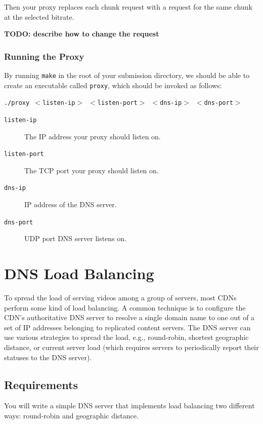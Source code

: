 \documentclass{article}
\begin{document}
Then your proxy replaces each chunk request with a request for the same chunk
at the selected bitrate.


\textbf{TODO: describe how to change the request}


\subsubsection{Running the Proxy}

By running \texttt{make} in the root of your
submission directory, we should be able to create an executable called
\texttt{proxy}, which should be invoked as follows:
\begin{center}
	\texttt{./proxy $<$listen-ip$>$ $<$listen-port$>$ $<$dns-ip$>$ $<$dns-port$>$}
\end{center}

\begin{description}
	\item[\texttt{listen-ip}] The IP address your proxy should listen on.
	\item[\texttt{listen-port}] The TCP port your proxy should listen on.
	\item[\texttt{dns-ip}] IP address of the DNS server.
	\item[\texttt{dns-port}] UDP port DNS server listens on.
\end{description}





\section{DNS Load Balancing}
\label{sec:dns}

To spread the load of serving videos among a group of servers, most CDNs
perform some kind of load balancing. A common technique is to configure the
CDN's authoritative DNS server to resolve a single domain name to one out of a
set of IP addresses belonging to replicated content servers. The DNS server can
use various strategies to spread the load, e.g., round-robin, shortest
geographic distance, or current server load (which requires servers to
periodically report their statuses to the DNS server).

\subsection{Requirements}

You will write a simple DNS server that implements load balancing two different
ways: round-robin and geographic distance.
\end{document}
